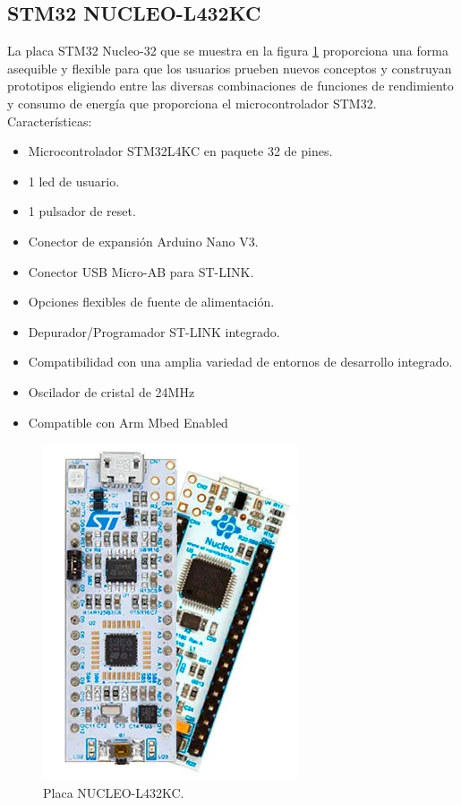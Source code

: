 \subsection{STM32 NUCLEO-L432KC}
La placa STM32 Nucleo-32 que se muestra en la figura \ref{fig:nucleol432kc} proporciona una forma asequible y flexible para que los usuarios prueben nuevos conceptos y construyan prototipos eligiendo entre las diversas combinaciones de funciones de rendimiento y consumo de energía que proporciona el microcontrolador STM32\citep{NUCLEOL432KC}.
\\Características:
\begin{itemize}
	\item Microcontrolador STM32L4KC en paquete 32 de pines.
	\item 1 led de usuario.
	\item 1 pulsador de reset.
	\item Conector de expansión Arduino Nano V3.
	\item Conector USB Micro-AB para ST-LINK.
	\item Opciones flexibles de fuente de alimentación.
	\item Depurador/Programador ST-LINK integrado.
	\item Compatibilidad con una amplia variedad de entornos de desarrollo integrado.
	\item Oscilador de cristal de 24MHz
	\item Compatible con Arm Mbed Enabled  
\end{itemize}
\begin{figure}[htbp]
	\centering
	\includegraphics[width=.4\textwidth]{./Figures/nucleo-l432kc.jpg}
	\caption{Placa NUCLEO-L432KC.}
	\label{fig:nucleol432kc}
\end{figure}
\vspace{5cm}

